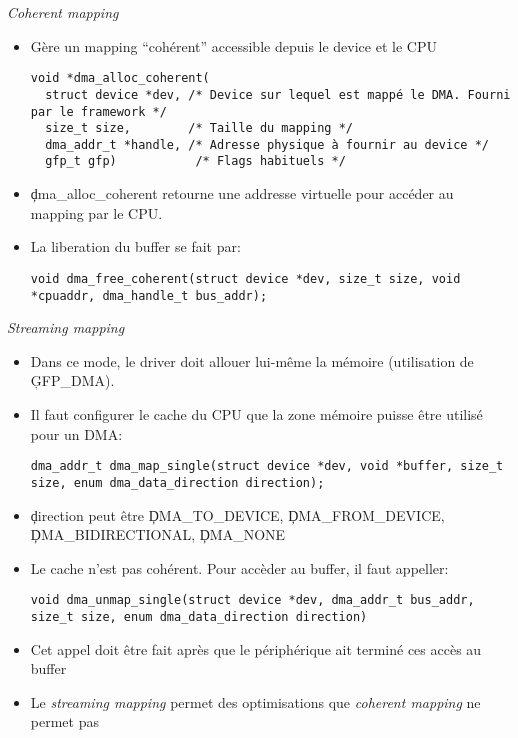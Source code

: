 \begin{frame}[fragile=singleslide]{\emph{Coherent mapping}}
  \begin{itemize}
  \item Gère un mapping ``cohérent'' accessible depuis le device et le
    CPU
    \begin{lstlisting} 
void *dma_alloc_coherent(
  struct device *dev, /* Device sur lequel est mappé le DMA. Fourni par le framework */
  size_t size,        /* Taille du mapping */
  dma_addr_t *handle, /* Adresse physique à fournir au device */
  gfp_t gfp)           /* Flags habituels */
    \end{lstlisting} 
  \item  \c{dma_alloc_coherent} retourne  une addresse  virtuelle pour
    accéder au mapping par le CPU.
  \item La liberation du buffer se fait par:
    \begin{lstlisting} 
void dma_free_coherent(struct device *dev, size_t size, void *cpuaddr, dma_handle_t bus_addr);
    \end{lstlisting} 
  \end{itemize} 
\end{frame} 

\begin{frame}[fragile=singleslide]{\emph{Streaming mapping}}
  \begin{itemize} 
  \item Dans ce mode, le driver doit allouer lui-même la mémoire
    (utilisation de \c{GFP_DMA}).
  \item Il faut configurer le cache du CPU que la zone mémoire puisse
    être utilisé pour un DMA:
    \begin{lstlisting} 
dma_addr_t dma_map_single(struct device *dev, void *buffer, size_t size, enum dma_data_direction direction);
    \end{lstlisting} 
  \item \c{direction} peut être \c{DMA_TO_DEVICE},
    \c{DMA_FROM_DEVICE}, \c{DMA_BIDIRECTIONAL}, \c{DMA_NONE}
  \item Le cache n'est pas cohérent. Pour accèder au buffer, il faut
    appeller:
    \begin{lstlisting} 
void dma_unmap_single(struct device *dev, dma_addr_t bus_addr, size_t size, enum dma_data_direction direction)
    \end{lstlisting} 
  \item Cet appel doit être fait après que le périphérique ait terminé
    ces accès au buffer
  \item Le \emph{streaming mapping} permet des optimisations que
    \emph{coherent mapping} ne permet pas
  \end{itemize}
\end{frame} 

